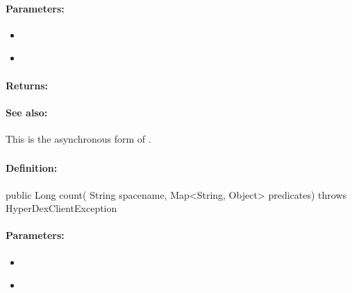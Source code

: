 \paragraph{Parameters:}
\begin{itemize}[noitemsep]
\item {}\\

\item {}\\

\end{itemize}

\paragraph{Returns:}


\paragraph{See also:}  This is the asynchronous form of .

\pagebreak
\subsubsection{}
\label{api:java:count}


\paragraph{Definition:}
\begin{javacode}
public Long count(
        String spacename,
        Map<String, Object> predicates) throws HyperDexClientException
\end{javacode}

\paragraph{Parameters:}
\begin{itemize}[noitemsep]
\item {}\\

\item {}\\

\end{itemize}

